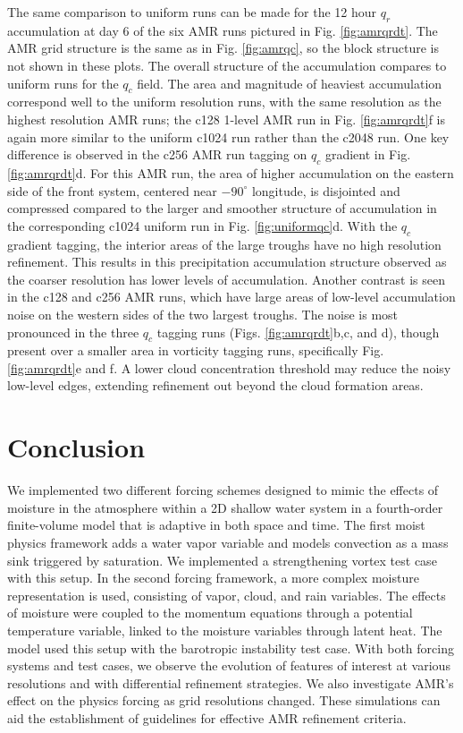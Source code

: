 \documentclass{ametsoc}
\begin{document}
The same comparison to uniform runs can be made for the 12 hour $q_r$ accumulation
at day 6 of the six AMR runs pictured in Fig. \ref{fig:amrqrdt}. The AMR grid structure is the same
as in Fig. \ref{fig:amrqc}, so the block structure is not shown in these plots. The overall structure
of the accumulation compares to uniform runs for the $q_c$ field.
The area and magnitude of heaviest accumulation correspond well to the uniform resolution runs,
with the same resolution as the highest resolution AMR runs; the c128 1-level AMR run
in Fig. \ref{fig:amrqrdt}f is again more similar to the uniform c1024 run rather than the c2048 run.
One key difference is observed in the 
c256 AMR run tagging on $q_c$ gradient in Fig. \ref{fig:amrqrdt}d. For this AMR run, the
 area of higher accumulation on the eastern side of the front
system, centered near $-90^\circ$ longitude,
is disjointed and compressed compared to the larger and smoother structure of accumulation in
the corresponding c1024 uniform run in Fig. \ref{fig:uniformqc}d.
With the $q_c$ gradient tagging, the interior areas of the large troughs have no high resolution refinement. 
This results in this precipitation accumulation structure observed 
as the coarser resolution has lower levels of accumulation.
Another contrast is seen in the c128 and c256 AMR runs, which have large areas of low-level accumulation noise 
on the western sides of the two largest troughs. The noise is most pronounced in the three
$q_c$ tagging runs (Figs. \ref{fig:amrqrdt}b,c, and d), though present over a smaller area in vorticity tagging runs, 
specifically Fig. \ref{fig:amrqrdt}e and f. A lower cloud concentration threshold may reduce the noisy low-level edges, extending refinement out beyond the cloud formation areas.

\section{Conclusion}
\label{sec:conclusion2}
We implemented two different forcing schemes designed to 
mimic the effects of moisture in the atmosphere within a 2D 
shallow water system in a fourth-order finite-volume model
that is adaptive in both space and time. The first moist physics
framework adds a water vapor variable and models convection
as a mass sink triggered by saturation. We implemented a
strengthening vortex test case with this setup.  In the second
forcing framework, a more complex moisture representation
is used, consisting of vapor, cloud, and rain variables.
The effects of moisture were coupled to the momentum equations
through a potential temperature variable, linked to
the moisture variables through latent heat. The model used
this setup with the barotropic instability test case. 
With both forcing systems and test cases, we observe
the evolution of features of interest at various resolutions and 
with differential refinement strategies. 
We also investigate AMR's effect on the physics 
forcing as grid resolutions changed.
These simulations can aid the
establishment of guidelines for effective AMR refinement criteria.
\end{document}
